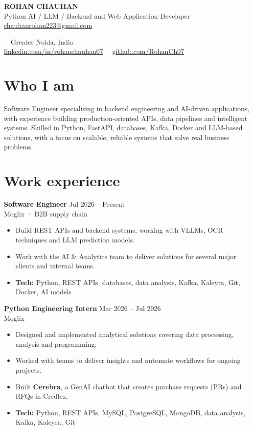 \documentclass[10pt,a4paper]{article}
\newif\ifshowphone
\newcommand{\phonenumber}{+91 XXXXX XXXXX}   %
\newcommand{\role}[3]{%
  \textbf{#1} \hfill {\color{muted}\small #3}\\
  {\color{muted}#2}\par\vspace{1pt}}
\newcommand{\tech}[1]{{\small\textbf{Tech:} #1}}
\begin{document}
\begin{center}
  {\fontsize{24}{26}\selectfont\bfseries ROHAN CHAUHAN}\\[3pt]
  {\color{muted}Python AI / LLM / Backend and Web Application Developer}\\[4pt]
  \small
  \href{mailto:chauhanrohan223@gmail.com}{chauhanrohan223@gmail.com}
  \ifshowphone\ \textbar\ \phonenumber\fi
  \ \textbar\ Greater Noida, India\\
  \href{https://www.linkedin.com/in/rohanchauhan07/}{linkedin.com/in/rohanchauhan07}
  \ \textbar\ \href{https://github.com/RohanCh07}{github.com/RohanCh07}
\end{center}

\section{Who I am}
Software Engineer specialising in backend engineering and AI-driven applications, with experience building
production-oriented APIs, data pipelines and intelligent systems. Skilled in Python, FastAPI, databases, Kafka,
Docker and LLM-based solutions, with a focus on scalable, reliable systems that solve real business problems.

\section{Work experience}
\role{Software Engineer}{Moglix · B2B supply chain}{Jul 2026 -- Present}
\begin{itemize}
  \item Build REST APIs and backend systems, working with VLLMs, OCR techniques and LLM prediction models.
  \item Work with the AI \& Analytics team to deliver solutions for several major clients and internal teams.
  \item \tech{Python, REST APIs, databases, data analysis, Kafka, Kaleyra, Git, Docker, AI models}
\end{itemize}
\vspace{4pt}

\role{Python Engineering Intern}{Moglix}{Mar 2026 -- Jul 2026}
\begin{itemize}
  \item Designed and implemented analytical solutions covering data processing, analysis and programming.
  \item Worked with teams to deliver insights and automate workflows for ongoing projects.
  \item Built \textbf{Cerebra}, a GenAI chatbot that creates purchase requests (PRs) and RFQs in Credlex.
  \item \tech{Python, REST APIs, MySQL, PostgreSQL, MongoDB, data analysis, Kafka, Kaleyra, Git}
\end{itemize}
\vspace{4pt}
\end{document}
